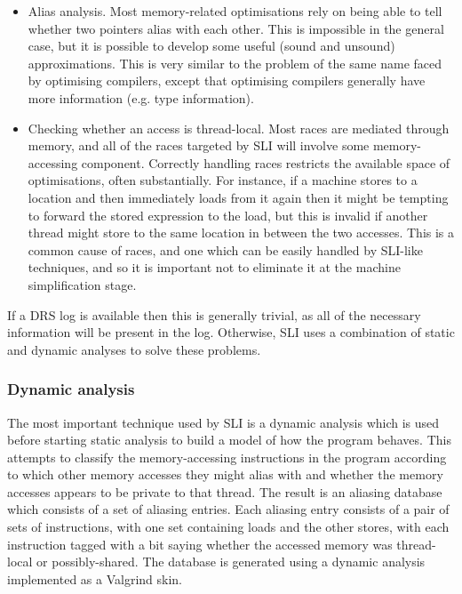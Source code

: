 \documentclass[12pt,a4paper]{book}
\begin{document}
\begin{itemize}
\item
  Alias analysis.
  Most memory-related optimisations rely on being able to tell whether two pointers alias with each other.
  This is impossible in the general case, but it is possible to develop some useful (sound and unsound) approximations.
  This is very similar to the problem of the same name faced by optimising compilers, except that optimising compilers generally have more information (e.g. type information).
\item
  Checking whether an access is thread-local.
  Most races are mediated through memory, and all of the races targeted by SLI will involve some memory-accessing component.
  Correctly handling races restricts the available space of optimisations, often substantially.
  For instance, if a machine stores to a location and then immediately loads from it again then it might be tempting to forward the stored expression to the load, but this is invalid if another thread might store to the same location in between the two accesses.
  This is a common cause of races, and one which can be easily handled by SLI-like techniques, and so it is important not to eliminate it at the machine simplification stage.
\end{itemize}

If a DRS log is available then this is generally trivial, as all of the necessary information will be present in the log.
Otherwise, SLI uses a combination of static and dynamic analyses to solve these problems.

\subsubsection{Dynamic analysis}

The most important technique used by SLI is a dynamic analysis which is used before starting static analysis to build a model of how the program behaves.
This attempts to classify the memory-accessing instructions in the program according to which other memory accesses they might alias with and whether the memory accesses appears to be private to that thread.
The result is an aliasing database which consists of a set of aliasing entries.
Each aliasing entry consists of a pair of sets of instructions, with one set containing loads and the other stores, with each instruction tagged with a bit saying whether the accessed memory was thread-local or possibly-shared.
The database is generated using a dynamic analysis implemented as a Valgrind skin.
\end{document}
